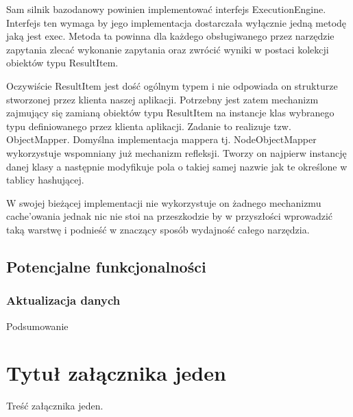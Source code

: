 \documentclass[brudnopis]{xmgr}
\begin{document}
Sam silnik bazodanowy powinien implementować interfejs ExecutionEngine. Interfejs ten wymaga by jego implementacja dostarczała wyłącznie jedną metodę jaką jest exec. Metoda ta powinna dla każdego obsługiwanego przez narzędzie zapytania zlecać wykonanie zapytania oraz zwrócić wyniki w postaci kolekcji obiektów typu ResultItem.

Oczywiście ResultItem jest dość ogólnym typem i nie odpowiada on strukturze stworzonej przez klienta naszej aplikacji. Potrzebny jest zatem mechanizm zajmujący się zamianą obiektów typu ResultItem na instancje klas wybranego typu definiowanego przez klienta aplikacji. Zadanie to realizuje tzw. ObjectMapper. Domyślna implementacja mappera tj. NodeObjectMapper wykorzystuje wspomniany już mechanizm refleksji. Tworzy on najpierw instancję danej klasy a następnie modyfikuje pola o takiej samej nazwie jak te określone w tablicy hashującej.

W swojej bieżącej implementacji nie wykorzystuje on żadnego mechanizmu cache'owania jednak nic nie stoi na przeszkodzie by w przyszłości wprowadzić taką warstwę i podnieść w znaczący sposób wydajność całego narzędzia.

\section{Potencjalne funkcjonalności}

\subsection{Aktualizacja danych}

\summary
Podsumowanie

\appendix
\chapter{Tytuł załącznika jeden}

Treść załącznika jeden.




\listoftables

\listoffigures

\oswiadczenie
\end{document}
